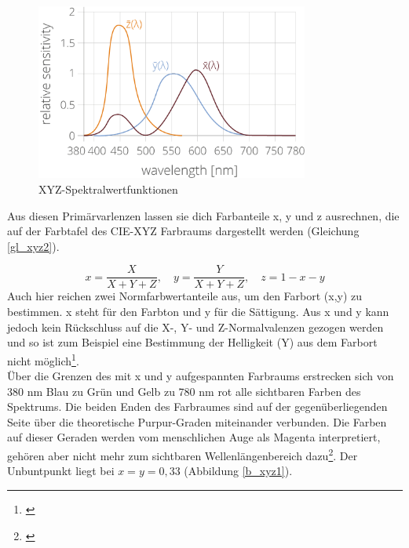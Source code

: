 \begin{figure}[H]     %
\centering
\includegraphics[width=0.8\textwidth]{bilder/xyz2} 
\caption {XYZ-Spektralwertfunktionen\protect\footnotemark}\label{b_xyz2}
\end{figure}
 
\noindent Aus diesen Primärvarlenzen lassen sie dich Farbanteile x, y und z ausrechnen, die auf der Farbtafel des CIE-XYZ Farbraums dargestellt werden (Gleichung \ref{gl_xyz2}). 

\begin{equation}\label{gl_xyz2}
		x = \frac{X}{X+Y+Z},\quad y = \frac{Y}{X+Y+Z},\quad z = 1-x-y
\end{equation}
Auch hier reichen zwei Normfarbwertanteile aus, um den Farbort (x,y) zu bestimmen. x steht für den Farbton und y für die Sättigung. Aus x und y kann jedoch kein Rückschluss auf die X-, Y- und Z-Normalvalenzen gezogen werden und so ist zum Beispiel eine Bestimmung der Helligkeit (Y) aus dem Farbort nicht möglich\footnote{\cite[79]{greule}}.\\
Über die Grenzen des mit x und y aufgespannten Farbraums erstrecken sich von 380 nm Blau zu Grün und Gelb zu 780 nm rot alle sichtbaren Farben des Spektrums. Die beiden Enden des Farbraumes sind auf der gegenüberliegenden Seite über die theoretische Purpur-Graden miteinander verbunden. Die Farben auf dieser Geraden werden vom menschlichen Auge als Magenta interpretiert, gehören aber nicht mehr zum sichtbaren Wellenlängenbereich dazu\footnote{\cite[73]{mueller}}. Der Unbuntpunkt liegt bei $x=y=0,33$ (Abbildung \ref{b_xyz1}).

